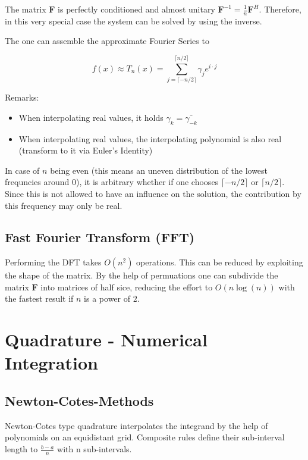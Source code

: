 \documentclass[
    a4paper,
    11pt
]{article}
\begin{document}
The matrix $\mathbf{F}$ is perfectly conditioned and almost unitary
$\mathbf{F}^{-1} = \frac{1}{n} \mathbf{F}^H$. Therefore, in this very special
case the system can be solved by using the inverse.

The one can assemble the approximate Fourier Series to

\begin{equation}
    f(x) \approx T_n(x) = \sum_{j=\lceil -n/2 \rceil}^{\lceil n/2 \rceil} \gamma_j e^{i\cdot j}
\end{equation}

Remarks:
\begin{itemize}
    \item When interpolating real values, it holds $\gamma_k =
        \bar{\gamma_{-k}}$
    \item When interpolating real values, the interpolating polynomial is also
        real (transform to it via Euler's Identity)
\end{itemize}

In case of $n$ being even (this means an uneven distribution of the lowest
frequncies around $0$), it is arbitrary whether if one chooses $\lceil -n/2
\rceil$ or $\lceil n/2 \rceil$. Since this is not allowed to have an influence
on the solution, the contribution by this frequency may only be real.

\subsection{Fast Fourier Transform (FFT)}

Performing the DFT takes $O(n^2)$ operations. This can be reduced by exploiting
the shape of the matrix. By the help of permuations one can subdivide the matrix
$\mathbf{F}$ into matrices of half sice, reducing the effort to $O(n\log(n))$
with the fastest result if $n$ is a power of $2$.


\section{Quadrature - Numerical Integration}

\subsection{Newton-Cotes-Methods}

Newton-Cotes type quadrature interpolates the integrand by the help of
polynomials on an equidistant grid. Composite rules define their sub-interval
length to $\frac{b-a}{n}$ with n sub-intervals.
\end{document}
